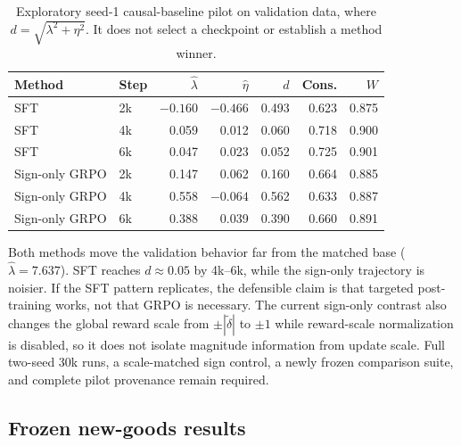 \documentclass[11pt,letterpaper]{article}
\newcommand{\dd}{\widetilde{\delta}}
\begin{document}
\begin{table}[htbp]
\centering
\scriptsize
\begin{tabular}{llrrrrr}
\toprule
Method & Step & $\widehat\lambda$ & $\widehat\eta$ & $d$ & Cons. & $W$ \\
\midrule
SFT & 2k & $-0.160$ & $-0.466$ & 0.493 & 0.623 & 0.875 \\
SFT & 4k & 0.059 & 0.012 & 0.060 & 0.718 & 0.900 \\
SFT & 6k & 0.047 & 0.023 & 0.052 & 0.725 & 0.901 \\
Sign-only GRPO & 2k & 0.147 & 0.062 & 0.160 & 0.664 & 0.885 \\
Sign-only GRPO & 4k & 0.558 & $-0.064$ & 0.562 & 0.633 & 0.887 \\
Sign-only GRPO & 6k & 0.388 & 0.039 & 0.390 & 0.660 & 0.891 \\
\bottomrule
\end{tabular}
\caption{Exploratory seed-1 causal-baseline pilot on validation data, where
$d=\sqrt{\lambda^2+\eta^2}$. It does not select a checkpoint or establish a
method winner.}
\label{tab:causal-pilot}
\end{table}

Both methods move the validation behavior far from the matched base
($\widehat\lambda=7.637$). SFT reaches $d\approx0.05$ by 4k--6k, while the
sign-only trajectory is noisier. If the SFT pattern replicates, the defensible
claim is that targeted post-training works, not that GRPO is necessary. The
current sign-only contrast also changes the global reward scale from
$\pm|\dd|$ to $\pm1$ while reward-scale normalization is disabled, so it does
not isolate magnitude information from update scale. Full two-seed 30k runs,
a scale-matched sign control, a newly frozen comparison suite, and complete
pilot provenance remain required.

\subsection{Frozen new-goods results}
\end{document}
